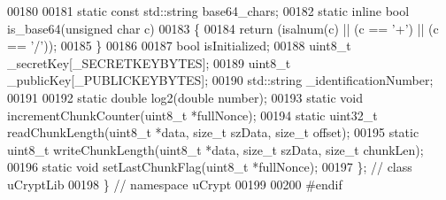 \begin{DoxyCode}
00180 
00181     \textcolor{keyword}{static} \textcolor{keyword}{const} std::string base64\_chars;
00182     \textcolor{keyword}{static} \textcolor{keyword}{inline} \textcolor{keywordtype}{bool} is\_base64(\textcolor{keywordtype}{unsigned} \textcolor{keywordtype}{char} c)
00183     \{
00184       \textcolor{keywordflow}{return} (isalnum(c) || (c == \textcolor{charliteral}{'+'}) || (c == \textcolor{charliteral}{'/'}));
00185     \}
00186 
00187     \textcolor{keywordtype}{bool} isInitialized;
00188     uint8\_t \_secretKey[\_SECRETKEYBYTES];
00189     uint8\_t \_publicKey[\_PUBLICKEYBYTES];
00190     std::string \_identificationNumber;
00191 
00192     \textcolor{keyword}{static} \textcolor{keywordtype}{double} log2(\textcolor{keywordtype}{double} number);
00193     \textcolor{keyword}{static} \textcolor{keywordtype}{void} incrementChunkCounter(uint8\_t *fullNonce);
00194     \textcolor{keyword}{static} uint32\_t readChunkLength(uint8\_t *data, \textcolor{keywordtype}{size\_t} szData, \textcolor{keywordtype}{size\_t} offset);
00195     \textcolor{keyword}{static} uint8\_t writeChunkLength(uint8\_t *data, \textcolor{keywordtype}{size\_t} szData, \textcolor{keywordtype}{size\_t} chunkLen);
00196     \textcolor{keyword}{static} \textcolor{keywordtype}{void} setLastChunkFlag(uint8\_t *fullNonce);
00197   \}; \textcolor{comment}{// class uCryptLib}
00198 \} \textcolor{comment}{// namespace uCrypt}
00199 
00200 \textcolor{preprocessor}{#endif}
\end{DoxyCode}
